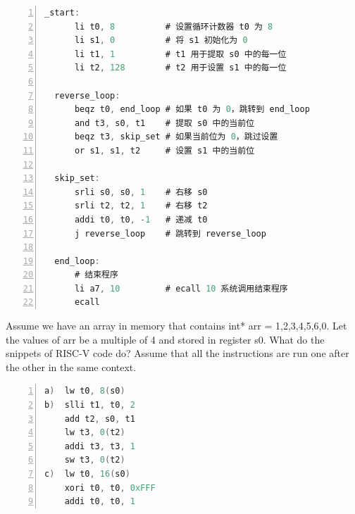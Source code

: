 \documentclass[cn,12pt]{homework}
\begin{document}
\begin{solution}
  \quad
  \begin{lstlisting}[language=C, caption=Code for Problem 2, label=code:example, frame=single, numbers=left, numberstyle=\tiny, breaklines=true, backgroundcolor=\color{lightgray}]
  _start:
      li t0, 8          # 设置循环计数器 t0 为 8
      li s1, 0          # 将 s1 初始化为 0
      li t1, 1          # t1 用于提取 s0 中的每一位
      li t2, 128        # t2 用于设置 s1 中的每一位

  reverse_loop:
      beqz t0, end_loop # 如果 t0 为 0，跳转到 end_loop
      and t3, s0, t1    # 提取 s0 中的当前位
      beqz t3, skip_set # 如果当前位为 0，跳过设置 
      or s1, s1, t2     # 设置 s1 中的当前位

  skip_set:
      srli s0, s0, 1    # 右移 s0
      srli t2, t2, 1    # 右移 t2
      addi t0, t0, -1   # 递减 t0
      j reverse_loop    # 跳转到 reverse_loop

  end_loop:
      # 结束程序
      li a7, 10         # ecall 10 系统调用结束程序
      ecall
  \end{lstlisting}

\end{solution}
\newpage

\begin{problem}
  \quad
Assume we have an array in memory that contains int* arr = {1,2,3,4,5,6,0}. Let the values of arr 
be a multiple of 4 and stored in register s0. What do the snippets of RISC-V code do? Assume that 
all the instructions are run one after the other in the same context.
  \begin{lstlisting}[language=C, caption=Code for Problem 2, label=code:example, frame=single, numbers=left, numberstyle=\tiny, breaklines=true, backgroundcolor=\color{lightgray}]
a)  lw t0, 8(s0)
b)  slli t1, t0, 2
    add t2, s0, t1
    lw t3, 0(t2)
    addi t3, t3, 1
    sw t3, 0(t2)
c)  lw t0, 16(s0)
    xori t0, t0, 0xFFF 
    addi t0, t0, 1
  \end{lstlisting}
  
\end{problem}
\end{document}
